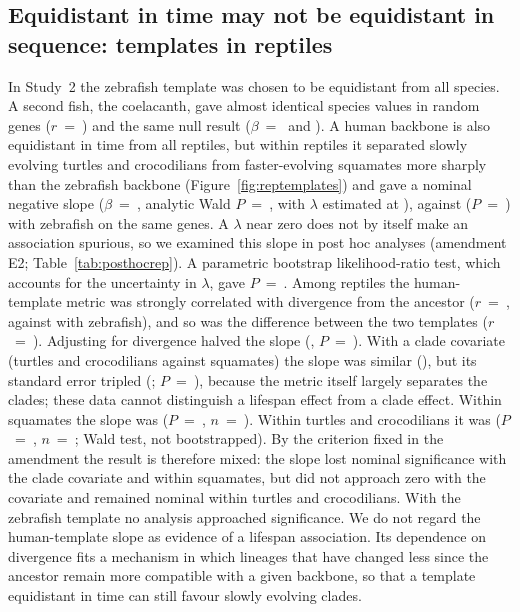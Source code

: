 \documentclass[11pt]{article}
\begin{document}
\subsection{Equidistant in time may not be equidistant in sequence: templates in reptiles}
\label{sec:reptiletemplates}
In Study~2 the zebrafish template was chosen to be equidistant from all species. A second fish, the coelacanth, gave almost identical species values in \RTplGenes{} random genes ($r$~=~\RTplRCoel) and the same null result ($\beta$~=~\RTplBetaZf{} and \RTplBetaCoel). A human backbone is also equidistant in time from all reptiles, but within reptiles it separated slowly evolving turtles and crocodilians from faster-evolving squamates more sharply than the zebrafish backbone (Figure~\ref{fig:reptemplates}) and gave a nominal negative slope ($\beta$~=~\RTplRepHuBeta, analytic Wald $P$~=~\RTplRepHuP, with $\lambda$ estimated at \RTplRepHuLambda), against \RTplRepZfBeta{} ($P$~=~\RTplRepZfP) with zebrafish on the same genes. A $\lambda$ near zero does not by itself make an association spurious, so we examined this slope in post hoc analyses (amendment E2; Table~\ref{tab:posthocrep}). A parametric bootstrap likelihood-ratio test, which accounts for the uncertainty in $\lambda$, gave $P$~=~\RPHHuBootP. Among reptiles the human-template metric was strongly correlated with divergence from the ancestor ($r$~=~\RPHHuRRate, against \RPHZfRRate{} with zebrafish), and so was the difference between the two templates ($r$~=~\RPHDiffRRate). Adjusting for divergence halved the slope (\RPHHuRateBeta, $P$~=~\RPHHuRateP). With a clade covariate (turtles and crocodilians against squamates) the slope was similar (\RPHHuCladeBeta), but its standard error tripled (\RPHHuCladeSE; $P$~=~\RPHHuCladeP), because the metric itself largely separates the clades; these data cannot distinguish a lifespan effect from a clade effect. Within squamates the slope was \RPHHuSqBeta{} ($P$~=~\RPHHuSqP, $n$~=~\RPHHuSqN). Within turtles and crocodilians it was \RPHHuArchBeta{} ($P$~=~\RPHHuArchP, $n$~=~\RPHHuArchN; Wald test, not bootstrapped). By the criterion fixed in the amendment the result is therefore mixed: the slope lost nominal significance with the clade covariate and within squamates, but did not approach zero with the covariate and remained nominal within turtles and crocodilians. With the zebrafish template no analysis approached significance. We do not regard the human-template slope as evidence of a lifespan association. Its dependence on divergence fits a mechanism in which lineages that have changed less since the ancestor remain more compatible with a given backbone, so that a template equidistant in time can still favour slowly evolving clades.
\end{document}
